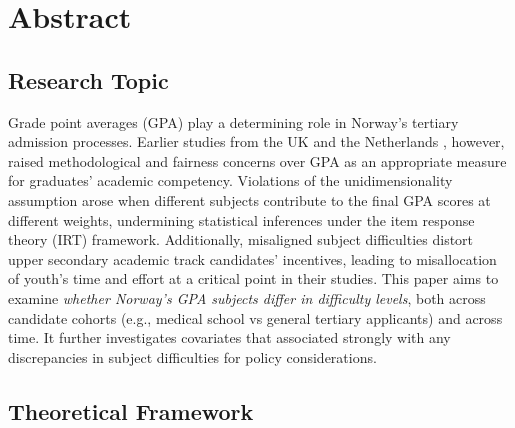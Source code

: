 \section{Abstract}


\subsection{Research Topic}

Grade point averages (GPA) play a determining role in Norway's tertiary admission processes. Earlier studies from the UK \parencite{he:2018} and the Netherlands \parencite{korobko:2008}, however, raised methodological and fairness concerns over GPA as an appropriate measure for graduates' academic competency. Violations of the unidimensionality assumption arose when different subjects contribute to the final GPA scores at different weights, undermining statistical inferences under the item response theory (IRT) framework. Additionally, misaligned subject difficulties distort upper secondary academic track candidates' incentives, leading to misallocation of youth's time and effort at a critical point in their studies. This paper aims to examine \emph{whether Norway's GPA subjects differ in difficulty levels}, both across candidate cohorts (e.g., medical school vs general tertiary applicants) and across time. It further investigates covariates that associated strongly with any discrepancies in subject difficulties for policy considerations.

\subsection{Theoretical Framework}

